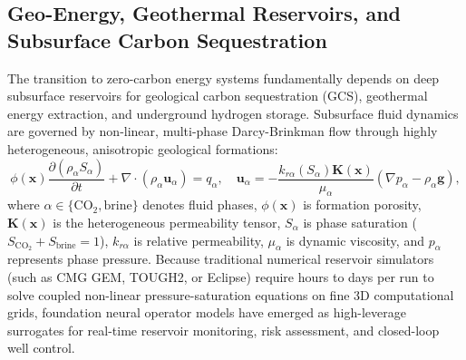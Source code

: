 \subsection{Geo-Energy, Geothermal Reservoirs, and Subsurface Carbon Sequestration}
\label{sec:geo_energy}
The transition to zero-carbon energy systems fundamentally depends on deep subsurface reservoirs for geological carbon sequestration (GCS), geothermal energy extraction, and underground hydrogen storage. Subsurface fluid dynamics are governed by non-linear, multi-phase Darcy-Brinkman flow through highly heterogeneous, anisotropic geological formations:
\begin{equation}
    \phi(\mathbf{x}) \frac{\partial (\rho_\alpha S_\alpha)}{\partial t} + \nabla \cdot (\rho_\alpha \mathbf{u}_\alpha) = q_\alpha, \quad \mathbf{u}_\alpha = -\frac{k_{r\alpha}(S_\alpha) \mathbf{K}(\mathbf{x})}{\mu_\alpha} \left( \nabla p_\alpha - \rho_\alpha \mathbf{g} \right),
    \label{eq:multiphase_darcy}
\end{equation}
where $\alpha \in \{\text{CO}_2, \text{brine}\}$ denotes fluid phases, $\phi(\mathbf{x})$ is formation porosity, $\mathbf{K}(\mathbf{x})$ is the heterogeneous permeability tensor, $S_\alpha$ is phase saturation ($S_{\text{CO}_2} + S_{\text{brine}} = 1$), $k_{r\alpha}$ is relative permeability, $\mu_\alpha$ is dynamic viscosity, and $p_\alpha$ represents phase pressure. Because traditional numerical reservoir simulators (such as CMG GEM, TOUGH2, or Eclipse) require hours to days per run to solve coupled non-linear pressure-saturation equations on fine 3D computational grids, foundation neural operator models have emerged as high-leverage surrogates for real-time reservoir monitoring, risk assessment, and closed-loop well control.

